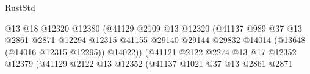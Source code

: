 \begin{lexlean}{RustStd}
\begin{coremodule}
                                                        @13
                                                        @18
                                                        @12320
                                                        @12380
                                                        (@41129
                                                          @2109
                                                          @13
                                                          @12320
                                                          (@41137
                                                            @989
                                                            @37
                                                            @13
                                                            @2861
                                                            @2871
                                                            @12294
                                                            @12315
                                                            @41155
                                                            @29140
                                                            @29144
                                                            @29832
                                                            @14014
                                                            (@13648 (@14016 @12315 @12295))
                                                            @14022))
                                                        (@41121
                                                          @2122
                                                          @2274
                                                          @13
                                                          @17
                                                          @12352
                                                          @12379
                                                          (@41129
                                                            @2122
                                                            @13
                                                            @12352
                                                            (@41137
                                                              @1021
                                                              @37
                                                              @13
                                                              @2861
                                                              @2871

\end{coremodule}
\end{lexlean}
